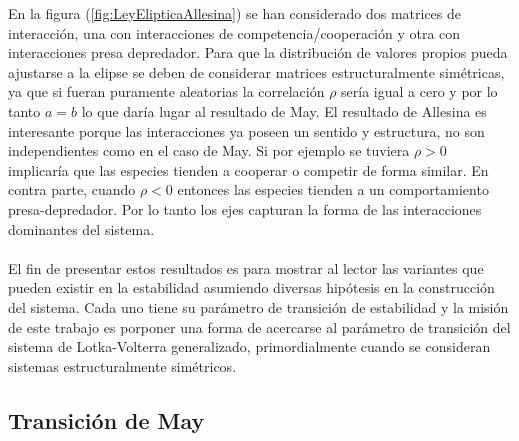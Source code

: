 En la figura (\ref{fig:LeyElipticaAllesina}) se han considerado dos matrices de interacción, una con interacciones de competencia/cooperación y otra con interacciones presa depredador. Para que la distribución de valores propios pueda ajustarse a la elipse se deben de considerar matrices estructuralmente simétricas, ya que si fueran puramente aleatorias la correlación $\rho$ sería igual a cero y por lo tanto $a=b$ lo que daría lugar al resultado de May. El resultado de Allesina es interesante porque las interacciones ya poseen un sentido y estructura, no son independientes como en el caso de May. Si por ejemplo se tuviera $\rho>0$ implicaría que las especies tienden a cooperar o competir de forma similar. En contra parte, cuando $\rho <0$ entonces las especies tienden a un comportamiento presa-depredador. Por lo tanto los ejes capturan la forma de las interacciones dominantes del sistema. \\
\\
El fin de presentar estos resultados es para mostrar al lector las variantes que pueden existir en la estabilidad asumiendo diversas hipótesis en la construcción del sistema. Cada uno tiene su parámetro de transición de estabilidad y la misión de este trabajo es porponer una forma de acercarse al parámetro de transición del sistema de Lotka-Volterra generalizado, primordialmente cuando se consideran sistemas estructuralmente simétricos.

\subsection{Transición de May}

